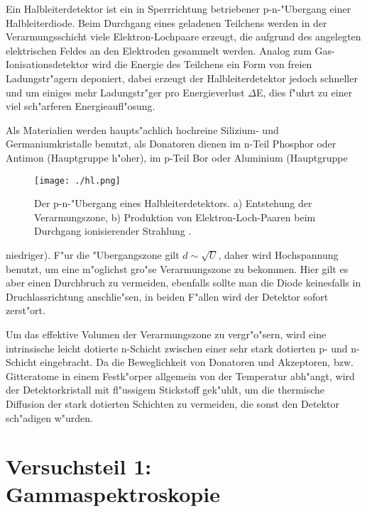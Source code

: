 \documentclass[12pt]{article}
\begin{document}
Ein Halbleiterdetektor ist ein in Sperrrichtung betriebener p-n-"Ubergang einer Halbleiterdiode. Beim Durchgang eines geladenen Teilchens werden in der Verarmungsschicht viele Elektron-Lochpaare erzeugt, die aufgrund des angelegten elektrischen Feldes an den Elektroden gesammelt werden. Analog zum Gas-Ionisationsdetektor wird die Energie des Teilchens ein Form von freien Ladungstr"agern deponiert, dabei erzeugt der Halbleiterdetektor jedoch schneller und um einiges mehr Ladungstr"ger pro Energieverlust $\Delta$E, dies f"uhrt zu einer viel sch"arferen Energieaufl"osung. \par 
Als Materialien werden haupts"achlich hochreine Silizium- und Germaniumkristalle benutzt, als Donatoren dienen im n-Teil Phosphor oder Antimon (Hauptgruppe h"oher), im p-Teil Bor oder Aluminium (Hauptgruppe
\begin{wrapfigure}{r}[2cm]{0.6\textwidth}
	\centering
	\texttt{[image: ./hl.png]}
	\caption[Halbleiterdetektor]{Der p-n-"Ubergang eines Halbleiterdetektors. a) Entstehung der Verarmungszone, b) Produktion von Elektron-Loch-Paaren beim Durchgang ionisierender Strahlung \cite{demtroeder}.}   
	\vspace{-110pt} %
	\label{fig:hl}
\end{wrapfigure}
niedriger). F"ur die "Ubergangszone gilt $d\sim\sqrt{U}$, daher wird Hochspannung benutzt, um eine m"oglichst gro"se Verarmungszone zu bekommen. Hier gilt es aber einen Durchbruch zu vermeiden, ebenfalls sollte man die Diode keinesfalls in Druchlassrichtung anschlie"sen, in beiden F"allen wird der Detektor sofort zerst"ort. \par 
Um das effektive Volumen der Verarmungszone zu vergr"o"sern, wird eine intrinsische leicht dotierte n-Schicht zwischen einer sehr stark dotierten p- und n-Schicht eingebracht. Da die Beweglichkeit von Donatoren und Akzeptoren, bzw. Gitteratome in einem Festk"orper allgemein von der Temperatur abh"angt, wird der Detektorkristall mit fl"ussigem Stickstoff gek"uhlt, um die thermische Diffusion der stark dotierten Schichten zu vermeiden, die sonst den Detektor sch"adigen w"urden.   

\newpage
\section{Versuchsteil 1: Gammaspektroskopie}
\end{document}
